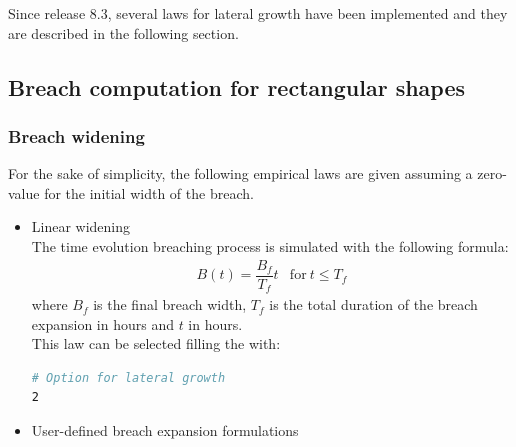 Since release 8.3, several laws for lateral growth have been implemented and they
are described in the following section.

\subsection{Breach computation for rectangular shapes}
\subsubsection{Breach widening}
For the sake of simplicity, the following empirical laws are given assuming a
zero-value for the initial width of the breach.

\begin{itemize}
\item Linear widening \\
The time evolution breaching process is simulated with the following formula:
\begin{equation}
\begin{array}{lc}
B(t)=\dfrac{B_f}{T_f}t & \text{for}~t\leq T_f
\end{array}
\end{equation}
where $B_f$ is the final breach width, $T_f$ is the total duration of the breach
expansion in hours and $t$ in hours. \\
This law can be selected filling the  with:
\begin{lstlisting}[language=bash]
# Option for lateral growth
2
\end{lstlisting}

\item User-defined breach expansion formulations


\end{itemize}
